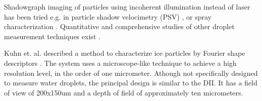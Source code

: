 Shadowgraph imaging of particles using incoherent illumination instead of laser has been tried e.g. in particle shadow velocimetry (PSV) \cite{este2005}, or spray characterization \cite{will2010}. Quantitative and comprehensive studies of other droplet measurement techniques exist \cite{dye1984,henn2013,conno2007}.

Kuhn et. al. \cite{kuhn2012} described a method to characterize ice particles by Fourier shape descriptors \cite{gran1972,walla1980}. The system uses a microscope-like technique to achieve a high resolution level, in the order of one micrometer. Athough not specifically designed to measure water droplets, the principal design is similar to the DII. It has a field of view of 200x150um and a depth of field of approximately ten micrometers.



